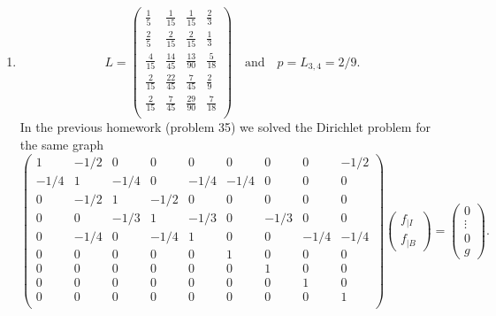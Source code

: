 \documentclass[12 pt, letterpaper]{hmcpset}
\begin{document}
\begin{solution}
\begin{enumerate}
			We know that $f_{\mid I}(i)$ is the $i$th entry of the column vector $L g$. But then, for our choice of $g$, $L g$ is just the $j$th column of $L$. Then, the probability that a random walk starting at the $i$th vertex first is the same as $f_{\mid I}(i)$ is the same as the $i$th entry of $Lg$, which ultimately is the same as the $(i, j)$th entry of $L$ as desired.

		\item
			\[
				\boxed{
					L = 
					\begin{pmatrix}
						\frac{1}{5} & \frac{ 1}{15} & \frac{ 1}{15} & \frac{ 2}{3} \\
						\frac{ 2}{5} & \frac{ 2}{15} & \frac{ 2}{15} & \frac{ 1}{3} \\
						\frac{4}{15} & \frac{14}{45} & \frac{13}{90} & \frac{5}{18} \\
						\frac{2}{15} & \frac{22}{45} & \frac{ 7}{45} & \frac{ 2}{9} \\
						\frac{2}{15} & \frac{ 7}{45} & \frac{29}{90} & \frac{7}{18} \\

					\end{pmatrix} \quad \text{and} \quad p = L_{3, 4} = 2 / 9.
				}
			\]
			In the previous homework (problem 35) we solved the Dirichlet problem for the same graph
			\[
		\begin{pmatrix}
			1 & -1/2 & 0 & 0 & 0 & 0 & 0 & 0 & -1/2 \\
			-1/4 & 1 & -1/4 & 0 & -1/4 & -1/4 & 0 & 0 & 0 \\
			0 & -1/2 & 1 & -1/2 & 0 & 0 & 0 & 0 & 0 \\
			0 & 0 & -1/3 & 1 & -1/3 & 0 & -1/3 & 0 & 0 \\
			0 & -1/4 & 0 & -1/4 & 1 & 0 & 0 & -1/4 & -1/4 \\
			0 & 0 & 0 & 0 & 0 & 1 & 0 & 0 & 0 \\
			0 & 0 & 0 & 0 & 0 & 0 & 1 & 0 & 0 \\
			0 & 0 & 0 & 0 & 0 & 0 & 0 & 1 & 0 \\
			0 & 0 & 0 & 0 & 0 & 0 & 0 & 0 & 1 \\
		\end{pmatrix} \begin{pmatrix}
			f_{\mid I} \\
			f_{\mid B}
		\end{pmatrix} = \begin{pmatrix}
			0 \\
			\vdots \\
			0 \\
			g
		\end{pmatrix}.
			\]


\end{enumerate}
\end{solution}
\end{document}
